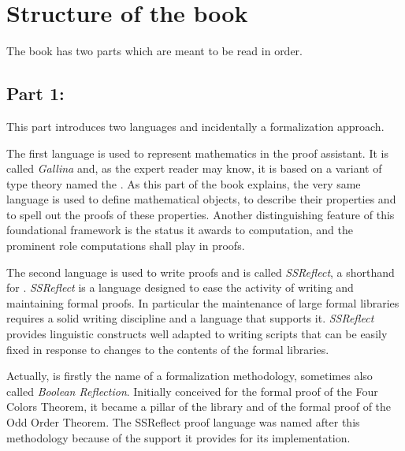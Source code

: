 \section*{Structure of the book}


The book has two parts which are meant to be
read in order.

\subsection*{Part 1: \partonename{}}

This part introduces two languages and incidentally a formalization approach.

The first language is used to represent mathematics in
the \Coq{} proof assistant. It is called \emph{Gallina} and, as the expert
reader may know, it is based on a variant of type theory named the
\mcbCIC{}. As this part of the book explains, the very same language is
used to define mathematical objects, to describe their properties and
to spell out the proofs of these properties. Another distinguishing
feature of this foundational framework is the status it awards to
computation, and the prominent role computations shall play in proofs.

The second language is used to write proofs and is called \emph{SSReflect},
a shorthand for \mcbSSR{}.
\emph{SSReflect} is a language designed to
ease the activity of writing and maintaining formal proofs.
In particular the maintenance of large
formal libraries requires a solid writing discipline
and a language that supports it.
\emph{SSReflect} provides linguistic constructs well adapted to
writing scripts that can be easily fixed in response to %
changes to the contents of the formal libraries.

Actually, \mcbSSR{} is firstly the name of a
formalization methodology, sometimes also called \emph{Boolean Reflection}.
Initially conceived for  the formal proof
of the Four Colors Theorem, it became a pillar of the \mcbMC{}
library and of the formal proof of the Odd Order
Theorem. The SSReflect proof language was named after this methodology
because of the support it provides for its implementation.

